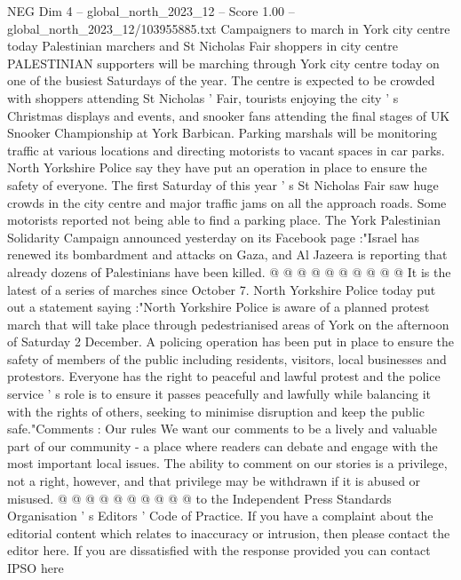 \begin{textsample}{NEG Dim 4 – global\_north\_2023\_12 – Score 1.00 – global\_north\_2023\_12/103955885.txt}  \label{ex:f4_neg_155}
Campaigners to march in York city centre today Palestinian marchers and St Nicholas Fair shoppers in city centre PALESTINIAN supporters will be marching through York city centre today on one of the busiest Saturdays of the year.
The centre is expected to be crowded with shoppers attending St Nicholas ' Fair, tourists enjoying the city ' s Christmas displays and events, and snooker fans attending the final stages of UK Snooker Championship at York Barbican.
Parking marshals will be monitoring traffic at various locations and directing motorists to vacant spaces in car parks.
North Yorkshire Police say they have put an operation in place to ensure the safety of everyone.
The first Saturday of this year ' s St Nicholas Fair saw huge crowds in the city centre and major traffic jams on all the approach roads.
Some motorists reported not being able to find a parking place.
The York Palestinian Solidarity Campaign announced yesterday on its Facebook page :"Israel has renewed its bombardment and attacks on Gaza, and Al Jazeera is reporting that already dozens of Palestinians have been killed. @ @ @ @ @ @ @ @ @ @ It is the latest of a series of marches since October 7.
North Yorkshire Police today put out a statement saying :"North Yorkshire Police is aware of a planned protest march that will take place through pedestrianised areas of York on the afternoon of Saturday 2 December.
A policing operation has been put in place to ensure the safety of members of the public including residents, visitors, local businesses and protestors.
Everyone has the right to peaceful and lawful protest and the police service ' s role is to ensure it passes peacefully and lawfully while balancing it with the rights of others, seeking to minimise disruption and keep the public safe."Comments : Our rules We want our comments to be a lively and valuable part of our community - a place where readers can debate and engage with the most important local issues.
The ability to comment on our stories is a privilege, not a right, however, and that privilege may be withdrawn if it is abused or misused. @ @ @ @ @ @ @ @ @ @ to the Independent Press Standards Organisation ' s Editors ' Code of Practice.
If you have a complaint about the editorial content which relates to inaccuracy or intrusion, then please contact the editor here.
If you are dissatisfied with the response provided you can contact IPSO here

\end{textsample}
